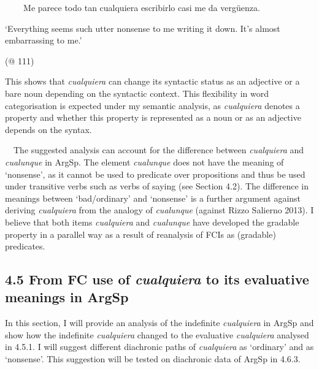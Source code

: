 \begin{styleStandard}
\textbf{\ \ }\ \ Me parece todo tan cualquiera escribirlo casi me da vergüenza.
\end{styleStandard}

\begin{styleStandard}
‘Everything seems such utter nonsense to me writing it down. It’s almost embarrassing to me.’
\end{styleStandard}

\begin{styleStandard}
(@ 111)
\end{styleStandard}

\begin{styleStandard}
This shows that \textit{cualquiera} can change its syntactic status as an adjective or a bare noun depending on the syntactic context. This flexibility in word categorisation is expected under my semantic analysis, as \textit{cualquiera} denotes a property and whether this property is represented as a noun or as an adjective depends on the syntax.
\end{styleStandard}

\begin{styleStandard}
\ \ The suggested analysis can account for the difference between \textit{cualquiera} and \textit{cualunque} in ArgSp. The element \textit{cualunque} does not have the meaning of ‘nonsense’, as it cannot be used to predicate over propositions and thus be used under transitive verbs such as verbs of saying (see Section 4.2). The difference in meanings between ‘bad/ordinary’ and ‘nonsense’ is a further argument against deriving \textit{cualquiera} from the analogy of \textit{cualunque} (against Rizzo Salierno 2013). I believe that both items \textit{cualquiera} and \textit{cualunque} have developed the gradable property in a parallel way as a result of reanalysis of FCIs as (gradable) predicates. 
\end{styleStandard}

\subsection[4.5 From FC use of cualquiera to its evaluative meanings in ArgSp]{\textbf{4.5}\textbf{\textit{ }}\textbf{From}\textbf{\textit{ }}\textbf{FC use of }\textbf{\textit{cualquiera}}\textbf{ }\textbf{to its evaluative meanings in Arg}\textbf{Sp}}
\begin{styleStandard}
In this section, I will provide an analysis of the indefinite \textit{cualquiera} in ArgSp and show how the indefinite \textit{cualquiera} changed to the evaluative \textit{cualquiera} analysed in 4.5.1. I will suggest different diachronic paths of \textit{cualquiera} as ‘ordinary’ and as ‘nonsense’. This suggestion will be tested on diachronic data of ArgSp in 4.6.3.
\end{styleStandard}

